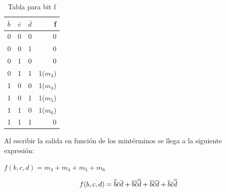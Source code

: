 \begin{table}[H]
	\begin{center}
		\caption{Tabla para bit f}
		\vspace{5mm}
		\begin{tabular}{l|c|c|r}
			\textbf{$\overline{b}$} & \textbf{$\overline{c}$} & \textbf{$\overline{d}$} & \textbf{f} \\
			\hline
			0                       & 0                       & 0                       & 0          \\
			0                       & 0                       & 1                       & 0          \\	
			0                       & 1                       & 0                       & 0          \\
			0                       & 1                       & 1                       & 1($m_{3}$) \\
			1                       & 0                       & 0                       & 1($m_{4}$) \\
			1                       & 0                       & 1                       & 1($m_{5}$) \\	
			1                       & 1                       & 0                       & 1($m_{6}$) \\
			1                       & 1                       & 1                       & 0          \\				
		\end{tabular}
	\end{center}
\end{table}
Al escribir la salida en función de los mintérminos se llega a la siguiente expresión:\\
\centerline{$f(b,c,d)=m_{3}+m_{4}+m_{5}+m_{6}$}
\begin{equation}
	\centerline{$f(b,c,d)=\overline{\overline{b}}\overline{c}\overline{d}+\overline{b}\overline{\overline{c}}\overline{\overline{d}}+\overline{b}\overline{\overline{c}}\overline{d}+\overline{b}\overline{c}\overline{\overline{d}}$}
\end{equation}

